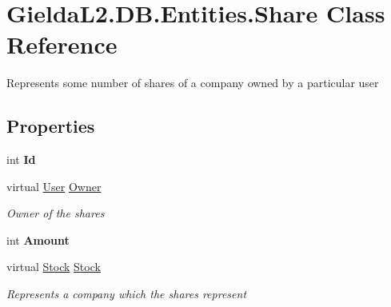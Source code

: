 \hypertarget{class_gielda_l2_1_1_d_b_1_1_entities_1_1_share}{}\section{Gielda\+L2.\+D\+B.\+Entities.\+Share Class Reference}
\label{class_gielda_l2_1_1_d_b_1_1_entities_1_1_share}


Represents some number of shares of a company owned by a particular user  


\subsection*{Properties}
\begin{DoxyCompactItemize}
\item 
\mbox{\label{class_gielda_l2_1_1_d_b_1_1_entities_1_1_share_ad96300d51d24b7675f6afc8a554cce9d}} 
int {\bfseries Id}
\item 
virtual \mbox{\hyperlink{class_gielda_l2_1_1_d_b_1_1_entities_1_1_user}{User}} \mbox{\hyperlink{class_gielda_l2_1_1_d_b_1_1_entities_1_1_share_ae2ad308ad36837a00e09d1bf49e6890b}{Owner}}
\begin{DoxyCompactList}\small\item\em Owner of the shares \end{DoxyCompactList}\item 
\mbox{\label{class_gielda_l2_1_1_d_b_1_1_entities_1_1_share_a7090c17c53c51b579b138b3b08d3bf67}} 
int {\bfseries Amount}
\item 
virtual \mbox{\hyperlink{class_gielda_l2_1_1_d_b_1_1_entities_1_1_stock}{Stock}} \mbox{\hyperlink{class_gielda_l2_1_1_d_b_1_1_entities_1_1_share_a9cf67a983e7ae7ba34ef200c971afe61}{Stock}}
\begin{DoxyCompactList}\small\item\em Represents a company which the shares represent \end{DoxyCompactList}\end{DoxyCompactItemize}


